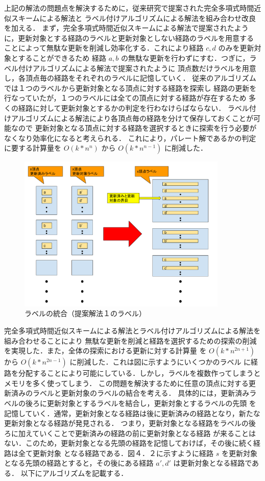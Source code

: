 \documentclass[12pt]{optlab-bachelor}
\begin{document}
上記の解法の問題点を解決するために，従来研究で提案された完全多項式時間近似スキームによる解法と
ラベル付けアルゴリズムによる解法を組み合わせ改良を加える．
まず，完全多項式時間近似スキームによる解法で提案されたように，更新対象とする経路のラベルと更新対象としない経路のラベルを用意する
ことによって無駄な更新を削減し効率化する．これにより経路 $c,d$ のみを更新対象とすることができるため
経路 $a,b$ の無駄な更新を行わずにすむ．つぎに，ラベル付けアルゴリズムによる解法で提案されたように
頂点数だけラベルを用意し，各頂点毎の経路をそれぞれのラベルに記憶していく．
従来のアルゴリズムでは１つのラベルから更新対象となる頂点に対する経路を探索し
経路の更新を行なっていたが，１つのラベルには全ての頂点に対する経路が存在するため
多くの経路に対して更新対象とするかの判定を行わなけらばならない．
ラベル付けアルゴリズムによる解法により各頂点毎の経路を分けて保存しておくことが可能なので
更新対象となる頂点に対する経路を選択するときに探索を行う必要がなくなり効率化になると考えられる．
これにより，パレート解であるかの判定に要する計算量を $O(k*n^n)$ から $O(k*n^{n-1})$ に削減した．


\begin{figure}[htbp]
  \centering
  \caption{ラベルの統合（提案解法１のラベル）}
  \includegraphics[width=10.0cm]{fig/fig4.pdf}
\end{figure}

完全多項式時間近似スキームによる解法とラベル付けアルゴリズムによる解法を組み合わせることにより
無駄な更新を削減と経路を選択するための探索の削減を実現した．また，全体の探索における更新に対する計算量
を $O(k*n^{2n+1})$ から $O(k*n^{2n-1})$ に削減した．これは図に示すようにいくつかのラベル
に経路を分配することにより可能にしている．しかし，ラベルを複数作ってしまうとメモリを多く使ってしまう．
この問題を解決するために任意の頂点に対する更新済みのラベルと更新対象のラベルの結合を考える．
具体的には，更新済みラベルの後ろに更新対象とするラベルを結合し，更新対象とするラベルの先頭
を記憶していく．通常，更新対象となる経路は後に更新済みの経路となり，新たな更新対象となる経路が発見される．
つまり，更新対象となる経路をラベルの後ろに加えていくことで更新済みの経路の前に更新対象となる経路
が来ることはない．このため，更新対象となる先頭の経路を記憶しておけば，その後に続く経路は全て更新対象
となる経路である．図４．２に示すように経路 $s$ を更新対象となる先頭の経路とすると，その後にある経路 $a',d'$
は更新対象となる経路である．
以下にアルゴリズムを記載する．
\end{document}
